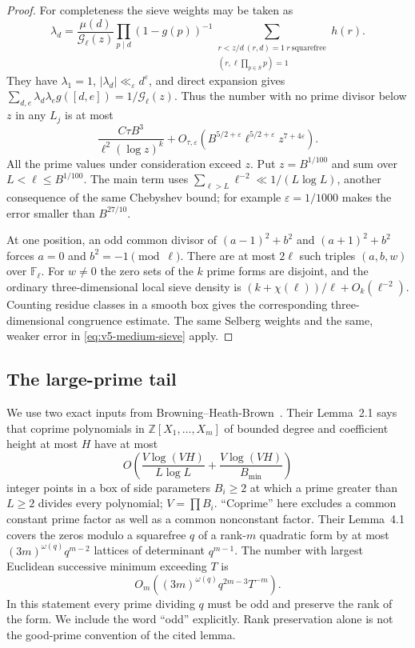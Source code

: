 \documentclass[11pt]{article}
\theoremstyle{definition}
\theoremstyle{remark}
\begin{document}
\begin{proof}
For completeness the sieve weights may be taken as
\[
 \lambda_d=\frac{\mu(d)}{\mathcal G_\ell(z)}
 \prod_{p\mid d}(1-g(p))^{-1}
 \sum_{\substack{r<z/d\ (r,d)=1\ r\ \text{squarefree}\\
                      (r,\ell\prod_{p\in S}p)=1}}h(r).
\]
They have $\lambda_1=1$, $|\lambda_d|\ll_\varepsilon d^\varepsilon$,
and direct expansion gives
$\sum_{d,e}\lambda_d\lambda_e g([d,e])=1/\mathcal G_\ell(z)$.
Thus the number with no prime divisor below $z$ in any $L_j$ is at most
\[
 \frac{C\tau B^3}{\ell^2(\log z)^k}
 +O_{\tau,\varepsilon}
  (B^{5/2+\varepsilon}\ell^{5/2+\varepsilon}z^{7+4\varepsilon}).
\]
All the prime values under consideration exceed $z$. Put $z=B^{1/100}$
and sum over $L<\ell\leq B^{1/100}$. The main term uses
$\sum_{\ell>L}\ell^{-2}\ll1/(L\log L)$, another consequence of the
same Chebyshev bound; for example
$\varepsilon=1/1000$ makes the error smaller than $B^{27/10}$.

At one position, an odd common divisor of $(a-1)^2+b^2$ and
$(a+1)^2+b^2$ forces $a=0$ and $b^2=-1\pmod\ell$.
There are at most $2\ell$ such triples $(a,b,w)$ over $\mathbb F_\ell$.
For $w\ne0$ the zero sets of the $k$ prime forms are disjoint, and the
ordinary three-dimensional local sieve density is
$(k+\chi(\ell))/\ell+O_k(\ell^{-2})$.
Counting residue classes in a smooth box gives the corresponding
three-dimensional congruence estimate. The same Selberg weights and the
same, weaker error in \eqref{eq:v5-medium-sieve} apply.
\end{proof}

\subsection{The large-prime tail}\label{subsec:v5-large-sieve}

We use two exact inputs from Browning--Heath-Brown~\cite{v5bhb}.
Their Lemma~2.1 says that coprime polynomials in $\mathbb Z[X_1,\ldots,X_m]$
of bounded degree and coefficient height at most $H$ have at most
\begin{equation}\label{eq:v5-box-sieve}
 O\left(\frac{V\log(VH)}{L\log L}
           +\frac{V\log(VH)}{B_{\min}}\right)
\end{equation}
integer points in a box of side parameters $B_i\geq2$ at which a prime
greater than $L\geq2$ divides every polynomial; $V=\prod B_i$.
``Coprime'' here excludes a common constant prime factor as well as a
common nonconstant factor. Their Lemma~4.1 covers the zeros modulo a
squarefree $q$ of a rank-$m$ quadratic form by at most
$(3m)^{\omega(q)}q^{m-2}$ lattices of determinant $q^{m-1}$.
The number with largest Euclidean successive minimum exceeding $T$ is
\begin{equation}\label{eq:v5-lattice-tail}
 O_m((3m)^{\omega(q)}q^{2m-3}T^{-m}).
\end{equation}
In this statement every prime dividing $q$ must be odd and preserve the
rank of the form. We include the word ``odd'' explicitly. Rank preservation
alone is not the good-prime convention of the cited lemma.
\end{document}
